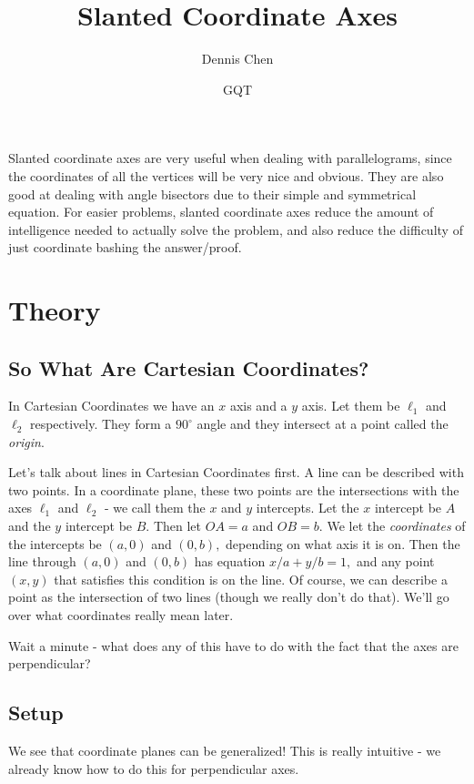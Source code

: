 \documentclass{article}
\title{Slanted Coordinate Axes}
\author{Dennis Chen}
\date{GQT}
\begin{document}
\maketitle

Slanted coordinate axes are very useful when dealing with parallelograms, since the coordinates of all the vertices will be very nice and obvious. They are also good at dealing with angle bisectors due to their simple and symmetrical equation. For easier problems, slanted coordinate axes reduce the amount of intelligence needed to actually solve the problem, and also reduce the difficulty of just coordinate bashing the answer/proof.

\section{Theory}

\subsection{So What Are Cartesian Coordinates?}
In Cartesian Coordinates we have an $x$ axis and a $y$ axis. Let them be $\ell_1$ and $\ell_2$ respectively. They form a $90^{\circ}$ angle and they intersect at a point called the \textit{origin}.

Let's talk about lines in Cartesian Coordinates first. A line can be described with two points. In a coordinate plane, these two points are the intersections with the axes $\ell_1$ and $\ell_2$ - we call them the $x$ and $y$ intercepts. Let the $x$ intercept be $A$ and the $y$ intercept be $B.$ Then let $OA=a$ and $OB=b.$ We let the \textit{coordinates} of the intercepts be $(a,0)$ and $(0,b),$ depending on what axis it is on. Then the line through $(a,0)$ and $(0,b)$ has equation $x/a+y/b=1,$ and any point $(x,y)$ that satisfies this condition is on the line. Of course, we can describe a point as the intersection of two lines (though we really don't do that). We'll go over what coordinates really mean later.

Wait a minute - what does any of this have to do with the fact that the axes are perpendicular?

\subsection{Setup}
We see that coordinate planes can be generalized! This is really intuitive - we already know how to do this for perpendicular axes.
\end{document}
